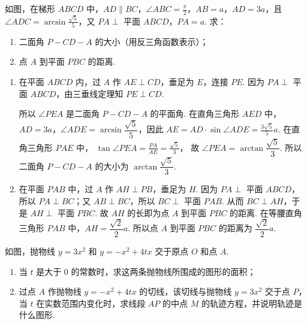 \begin{problem}
如图，在梯形 \(ABCD\) 中，\(AD \parallel BC\)，\(\angle ABC = \frac{\pi}{2}\)，\(AB = a\)，\(AD = 3a\)，且 \(\angle ADC = \arcsin \frac{\sqrt{5}}{5}\)，又 \(PA \perp\) 平面 \(ABCD\)，\(PA = a\). 求：

\begin{enumerate}
\item 二面角 \(P - CD - A\) 的大小（用反三角函数表示）；
\item 点 \(A\) 到平面 \(PBC\) 的距离.
\end{enumerate}

\end{problem}

\begin{solution}

\begin{enumerate}
\item 在平面 \(ABCD\) 内，过 \(A\) 作 \(AE \perp CD\)，垂足为 \(E\)，连接 \(PE\). 因为 \(PA \perp\) 平面 \(ABCD\)，由三垂线定理知 \(PE \perp CD\).

所以 \(\angle PEA\) 是二面角 \(P - CD - A\) 的平面角.
在直角三角形 \(AED\) 中，\(AD = 3a\)，\(\angle ADE = \arcsin \dfrac{\sqrt{5}}{5}\)，因此
\(AE = AD \cdot \sin \angle ADE = \frac{3\sqrt{5}}{5}a\).
在直角三角形 \(PAE\) 中，
\(\tan \angle PEA = \frac{PA}{AE} = \frac{\sqrt{5}}{3}\)，
故 \(\angle PEA = \arctan \dfrac{\sqrt{5}}{3}\).
所以二面角 \(P - CD - A\) 的大小为 \(\arctan \dfrac{\sqrt{5}}{3}\).

\item 在平面 \(PAB\) 中，过 \(A\) 作 \(AH \perp PB\)，垂足为 \(H\). 因为 \(PA \perp\) 平面 \(ABCD\)，所以 \(PA \perp BC\)；又 \(AB \perp BC\)，所以 \(BC \perp\) 平面 \(PAB\). 从而 \(BC \perp AH\)，于是 \(AH \perp\) 平面 \(PBC\).
故 \(AH\) 的长即为点 \(A\) 到平面 \(PBC\) 的距离.
在等腰直角三角形 \(PAB\) 中，\(AH = \dfrac{\sqrt{2}}{2}a\).
所以点 \(A\) 到平面 \(PBC\) 的距离为 \(\dfrac{\sqrt{2}}{2}a\).
\end{enumerate}
\end{solution}

\begin{problem}
如图，抛物线 \(y = 3x^2\) 和 \(y = -x^2 + 4tx\) 交于原点 \(O\) 和点 \(A\).

\begin{enumerate}
\item 当 \(t\) 是大于 \(0\) 的常数时，求这两条抛物线所围成的图形的面积；
\item 过点 \(A\) 作抛物线 \(y = -x^2 + 4tx\) 的切线，该切线与抛物线 \(y = 3x^2\) 交于点 \(P\)，当 \(t\) 在实数范围内变化时，求线段 \(AP\) 的中点 \(M\) 的轨迹方程，并说明轨迹是什么图形.
\end{enumerate}

\end{problem}

